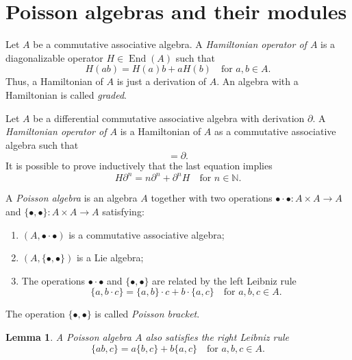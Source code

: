 \documentclass[a4paper, 12pt, reqno]{amsart}
\newtheorem{lemma}[theorem]{Lemma}
\theoremstyle{remark}
\DeclareMathOperator{\End}{End}
\begin{document}
\section{Poisson algebras and their modules}
\label{sec:poiss-algebr-their}

Let $A$ be a commutative associative algebra.
A \emph{Hamiltonian operator of $A$} is a diagonalizable operator $H \in \End(A)$ such that
\begin{equation*}
  H(ab) = H(a)b + aH(b) \quad \text{for $a, b \in A$}.
\end{equation*}
Thus, a Hamiltonian of $A$ is just a derivation of $A$.
An algebra with a Hamiltonian is called \emph{graded}.

Let $A$ be a differential commutative associative algebra with derivation $\partial$.
A \emph{Hamiltonian operator of $A$} is a Hamiltonian of $A$ as a commutative associative algebra such that
\begin{equation*}
  [H, \partial] = \partial.
\end{equation*}
It is possible to prove inductively that the last equation implies
\begin{equation}
  \label{eq:53}
  H\partial^n = n\partial^n + \partial^nH \quad \text{for $n \in \mathbb{N}$}.
\end{equation}

A \emph{Poisson algebra} is an algebra $A$ together with two operations $\bullet\cdot\bullet: A \times A \to A$ and $\{\bullet, \bullet\}: A \times A \to A$ satisfying:
\begin{enumerate}
\item $(A, \bullet\cdot\bullet)$ is a commutative associative algebra;
\item $(A, \{\bullet, \bullet\})$ is a Lie algebra;
\item The operations $\bullet\cdot\bullet$ and $\{\bullet, \bullet\}$ are related by the left Leibniz rule
  \begin{equation*}
    \{a, b\cdot c\} = \{a, b\}\cdot c + b\cdot\{a, c\} \quad \text{for $a, b, c \in A$}.
  \end{equation*}
\end{enumerate}
The operation $\{\bullet, \bullet\}$ is called \emph{Poisson bracket}.

\begin{lemma}
  \label{lmm:39}
  A Poisson algebra $A$ also satisfies the right Leibniz rule
  \begin{equation*}
    \{ab, c\} = a\{b, c\} + b\{a, c\} \quad \text{for $a, b, c \in A$}.
  \end{equation*}
\end{lemma}
\end{document}
